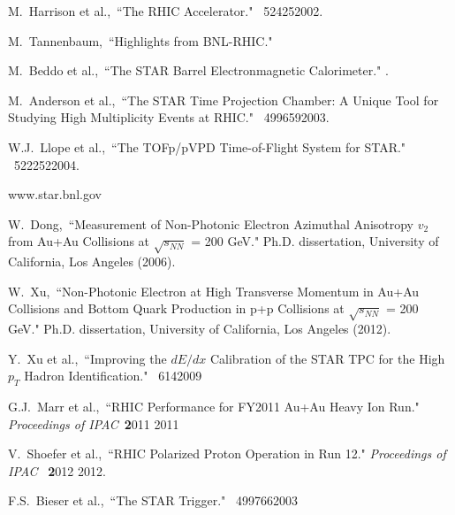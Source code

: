 \begin{thebibliography}{1000}




M.~Harrison et al.,~``The RHIC Accelerator." \Journal{\ARNPS} {~52}{425}{2002}.

M.~Tannenbaum,~``Highlights from BNL-RHIC." 

M.~Beddo et al.,~``The STAR Barrel Electronmagnetic Calorimeter." .

M.~Anderson et al.,~``The STAR Time Projection Chamber: A Unique Tool for Studying High Multiplicity Events at RHIC." \Journal{\NIM } {~499}{659}{2003}.

W.J.~Llope et al.,~``The TOFp/pVPD Time-of-Flight System for STAR." \Journal{\NIM} {~522}{252}{2004}.

www.star.bnl.gov

W.~Dong,~``Measurement of Non-Photonic Electron Azimuthal Anisotropy $v_2$ from Au+Au Collisions at $\sqrt{s_{NN}}$ = 200 GeV." Ph.D. dissertation, University of California, Los Angeles (2006).

W.~Xu,~``Non-Photonic Electron at High Transverse Momentum in Au+Au Collisions and Bottom Quark Production in p+p Collisions at $\sqrt{s_{NN}}$ = 200 GeV." Ph.D. dissertation, University of California, Los Angeles (2012).

Y.~Xu et al.,~``Improving the $dE/dx$ Calibration of the STAR TPC for the High $p_T$ Hadron Identification." \Journal{\NIM} {~614}{}{2009}

G.J.~Marr et al.,~``RHIC Performance for FY2011 Au+Au Heavy Ion Run." \textit {Proceedings of IPAC}~{\textbf 2011} {2011}

V.~Shoefer et al.,~``RHIC Polarized Proton Operation in Run 12." \textit {Proceedings of IPAC}
~{\textbf 2012} {2012}.

F.S.~Bieser et al.,~``The STAR Trigger." \Journal{\NIM} {~499}{766}{2003}


\end{thebibliography}
